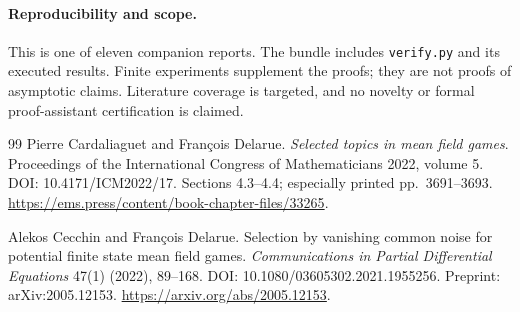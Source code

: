 \documentclass[11pt,a4paper]{article}
\theoremstyle{definition}
\theoremstyle{remark}
\begin{document}
\paragraph{Reproducibility and scope.} This is one of eleven companion reports. The bundle includes \texttt{verify.py} and its executed results. Finite experiments supplement the proofs; they are not proofs of asymptotic claims. Literature coverage is targeted, and no novelty or formal proof-assistant certification is claimed.

\begin{thebibliography}{99}
\small
{}
Pierre Cardaliaguet and Fran\c{c}ois Delarue.
\emph{Selected topics in mean field games}. Proceedings of the International Congress of Mathematicians 2022, volume 5.
DOI: 10.4171/ICM2022/17. Sections 4.3--4.4; especially printed pp.~3691--3693.
\url{https://ems.press/content/book-chapter-files/33265}.

Alekos Cecchin and Fran\c{c}ois Delarue.
Selection by vanishing common noise for potential finite state mean field games.
\emph{Communications in Partial Differential Equations} 47(1) (2022), 89--168.
DOI: 10.1080/03605302.2021.1955256. Preprint: arXiv:2005.12153.
\url{https://arxiv.org/abs/2005.12153}.

\end{thebibliography}
\end{document}
